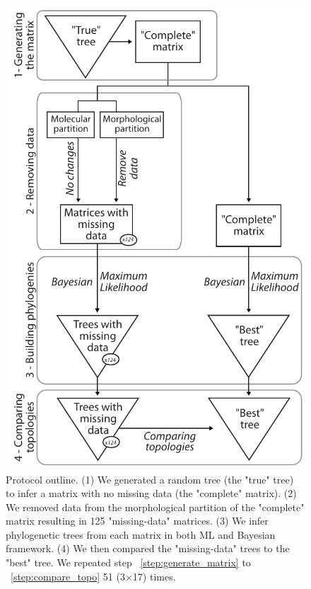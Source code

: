 \documentclass[12pt,letterpaper]{article}
\begin{document}
\begin{figure}
\centering
\includegraphics[keepaspectratio=true]{Figures/TEM_Fig_outline-BW.pdf}
\caption{Protocol outline.
(1) We generated a random tree (the "true" tree) to infer a matrix with no missing data (the "complete" matrix).
(2) We removed data from the morphological partition of the "complete" matrix resulting in 125 "missing-data" matrices.
(3) We infer phylogenetic trees from each matrix in both ML and Bayesian framework.
(4) We then compared the "missing-data" trees to the "best" tree.
We repeated step ~\ref{step:generate_matrix} to ~\ref{step:compare_topo} 51 (3$\times $17) times.}
\label{Fig_Outline}
\end{figure}
\end{document}
